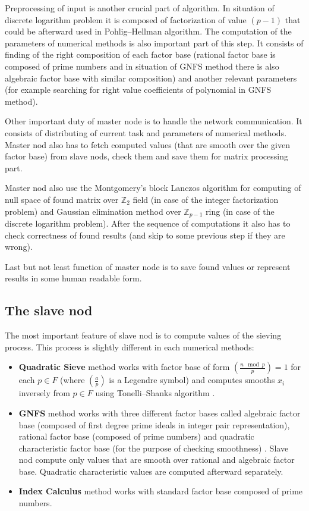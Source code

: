 \documentclass[conference]{IEEEtran}
\begin{document}
Preprocessing of input is another crucial part of algorithm. In situation of discrete logarithm problem it is composed of factorization of value $(p-1)$ that could be afterward used in Pohlig--Hellman algorithm. The computation of the parameters of numerical methods is also important part of this step. It consists of finding of the right composition of each factor base (rational factor base is composed of prime numbers and in situation of GNFS method there is also algebraic factor base with similar composition) and another relevant parameters (for example searching for right value coefficients of polynomial in GNFS method). 

Other important duty of master node is to handle the network communication. It consists of distributing of current task and parameters of numerical methods. Master nod also has to fetch computed values (that are smooth over the given factor base) from slave nods, check them and save them for matrix processing part.

Master nod also use the Montgomery's block Lanczos algorithm for computing of null space of found matrix over  $\mathbb{Z}_2$ field (in case of the integer factorization problem) and Gaussian elimination method over $\mathbb{Z}_{p-1}$ ring (in case of the discrete logarithm problem). After the sequence of computations it also has to check correctness of found results (and skip to some previous step if they are wrong).

Last but not least function of master node is to save found values or represent results in some human readable form.

\subsection{The slave nod}
The most important feature of slave nod is to compute values of the sieving process. This process is slightly different in each numerical methods:
\begin{itemize}
\item \textbf{Quadratic Sieve} method works with factor base of form $\left(\frac{n \mod p}{p} \right)=1$ for each $p \in F$ (where $\left(\frac{a}{p} \right)$ is a Legendre symbol) and computes smooths $x_i$ inversely from $p \in F$ using Tonelli--Shanks algorithm \cite{niven}.

\item \textbf{GNFS} method works with three different factor bases called algebraic factor base (composed of first degree prime ideals in integer pair representation), rational factor base (composed of prime numbers) and quadratic characteristic factor base (for the purpose of checking smoothness) \cite{hoang}. Slave nod compute only values that are smooth over rational and algebraic factor base. Quadratic characteristic values are computed afterward separately.

\item \textbf{Index Calculus} method works with standard factor base composed of prime numbers. \cite{yan}

\end{itemize}
\end{document}

